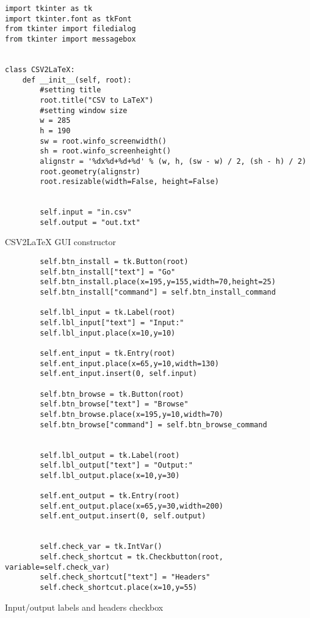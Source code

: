 \newpage
\begin{listing}[!ht]
    \begin{verbatim}
import tkinter as tk
import tkinter.font as tkFont
from tkinter import filedialog
from tkinter import messagebox


class CSV2LaTeX:
    def __init__(self, root):
        #setting title
        root.title("CSV to LaTeX")
        #setting window size
        w = 285
        h = 190
        sw = root.winfo_screenwidth()
        sh = root.winfo_screenheight()
        alignstr = '%dx%d+%d+%d' % (w, h, (sw - w) / 2, (sh - h) / 2)
        root.geometry(alignstr)
        root.resizable(width=False, height=False)
        
        
        self.input = "in.csv"
        self.output = "out.txt"
    \end{verbatim}
    \caption{CSV2LaTeX GUI constructor}
    \label{sc:csv2latex-gui-init-1}
\end{listing}

\newpage
\begin{listing}[!ht]
    \begin{verbatim}
        self.btn_install = tk.Button(root)
        self.btn_install["text"] = "Go"
        self.btn_install.place(x=195,y=155,width=70,height=25)
        self.btn_install["command"] = self.btn_install_command
        
        self.lbl_input = tk.Label(root)
        self.lbl_input["text"] = "Input:"
        self.lbl_input.place(x=10,y=10)
        
        self.ent_input = tk.Entry(root)
        self.ent_input.place(x=65,y=10,width=130)
        self.ent_input.insert(0, self.input)
        
        self.btn_browse = tk.Button(root)
        self.btn_browse["text"] = "Browse"
        self.btn_browse.place(x=195,y=10,width=70)
        self.btn_browse["command"] = self.btn_browse_command
        
        
        self.lbl_output = tk.Label(root)
        self.lbl_output["text"] = "Output:"
        self.lbl_output.place(x=10,y=30)
        
        self.ent_output = tk.Entry(root)
        self.ent_output.place(x=65,y=30,width=200)
        self.ent_output.insert(0, self.output)
        
        
        self.check_var = tk.IntVar()
        self.check_shortcut = tk.Checkbutton(root, variable=self.check_var)
        self.check_shortcut["text"] = "Headers"
        self.check_shortcut.place(x=10,y=55)
    \end{verbatim}
    \caption{Input/output labels and headers checkbox}
    \label{sc:csv2latex-gui-init-2}
\end{listing}

